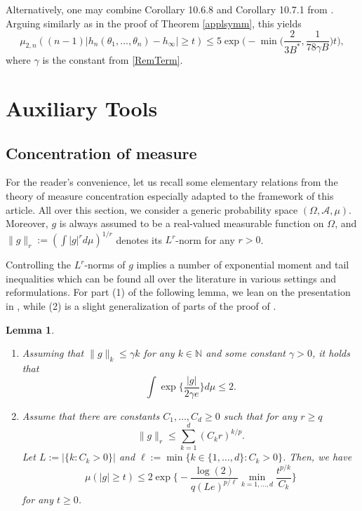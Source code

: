 \documentclass[a4paper,12pt]{amsart}
\numberwithin{equation}{section}
\newtheorem{lemma}[satz]{Lemma}
\theoremstyle{remark}
\def\N{{\mathbb N}}
\begin{document}
Alternatively, one may combine Corollary 10.6.8 and Corollary 10.7.1 from \cite{BCG23}. Arguing similarly as in the proof of Theorem \ref{applsymm}, this yields
\[
    \mu_{2,n}((n-1)|h_n(\theta_1, \ldots, \theta_n) - h_\infty| \ge t) \le 5 \exp \Big(- \min\Big(\frac{2}{3B^\ast}, \frac{1}{78\gamma B}\Big) t\Big),
    \]
where $\gamma$ is the constant from \eqref{RemTerm}.

\appendix
\section{Auxiliary Tools}\label{AppAux}

\subsection{Concentration of measure}
For the reader's convenience, let us recall some elementary relations from the theory of measure concentration especially adapted to the framework of this article. All over this section, we consider a generic probability space $(\Omega,\mathcal{A},\mu)$. Moreover, $g$ is always assumed to be a real-valued measurable function on $\Omega$, and $\lVert g \rVert_r := (\int |g|^r d\mu)^{1/r}$ denotes its $L^r$-norm for any $r > 0$.

Controlling the $L^r$-norms of $g$ implies a number of exponential moment and tail inequalities which can be found all over the literature in various settings and reformulations. For part (1) of the following lemma, we lean on the presentation in \cite[Eq.\ (2.17)]{BGS19}, while (2) is a slight generalization of parts of the proof of \cite[Th.\ 3.6]{SS20}.

\begin{lemma}\label{ConcLemma}
    \begin{enumerate}
        \item Assuming that $\lVert g \rVert_k \le \gamma k$ for any $k \in \N$ and some constant $\gamma > 0$, it holds that
        \[
        \int \exp\Big\{ \frac{|g|}{2\gamma e}\Big\} d\mu \le 2.
        \]
        \item Assume that there are constants $C_1, \ldots, C_d \ge 0$ such that for any $r \ge q$
  \[
    \lVert g \rVert_r \le \sum_{k = 1}^{d} (C_k r)^{k/p}.
  \]
  Let $L := |\{ k : C_k > 0\}|$ and $\ell := \min \{ k \in \{1,\ldots,d\} : C_k > 0 \}$. Then, we have
        \[
        \mu(|g| \ge t) \le 2 \exp\Big\{-\frac{\log(2)}{q(Le)^{p/\ell}} \min_{k=1,\ldots,d} \frac{t^{p/k}}{C_k}\Big\}
        \]
        for any $t \ge 0$.
    \end{enumerate}
\end{lemma}
\end{document}
